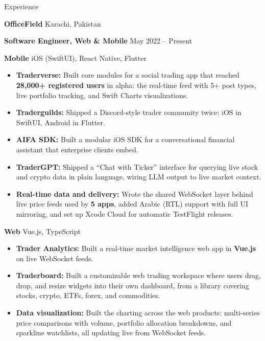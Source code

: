 \documentclass{resume}
\begin{document}
\begin{rSection}{Experience}

\textbf{OfficeField} \hfill Karachi, Pakistan

\textbf{Software Engineer, Web \& Mobile} \hfill May 2022 -- Present

\textbf{Mobile} \hfill iOS (SwiftUI), React Native, Flutter
\begin{itemize}
\itemsep 1pt {}
\item \textbf{Traderverse:} Built core modules for a social trading app that reached \textbf{28,000+ registered users} in alpha: the real-time feed with 5+ post types, live portfolio tracking, and Swift Charts visualizations.
\item \textbf{Traderguilds:} Shipped a Discord-style trader community twice: iOS in SwiftUI, Android in Flutter.
\item \textbf{AIFA SDK:} Built a modular iOS SDK for a conversational financial assistant that enterprise clients embed.
\item \textbf{TraderGPT:} Shipped a ``Chat with Ticker'' interface for querying live stock and crypto data in plain language, wiring LLM output to live market context.
\item \textbf{Real-time data and delivery:} Wrote the shared WebSocket layer behind live price feeds used by \textbf{5 apps}, added Arabic (RTL) support with full UI mirroring, and set up Xcode Cloud for automatic TestFlight releases.
\end{itemize}

\textbf{Web} \hfill Vue.js, TypeScript
\begin{itemize}
\itemsep 1pt {}
\item \textbf{Trader Analytics:} Built a real-time market intelligence web app in \textbf{Vue.js} on live WebSocket feeds.
\item \textbf{Traderboard:} Built a customizable web trading workspace where users drag, drop, and resize widgets into their own dashboard, from a library covering stocks, crypto, ETFs, forex, and commodities.
\item \textbf{Data visualization:} Built the charting across the web products: multi-series price comparisons with volume, portfolio allocation breakdowns, and sparkline watchlists, all updating live from WebSocket feeds.
\end{itemize}

\end{rSection}
\end{document}
